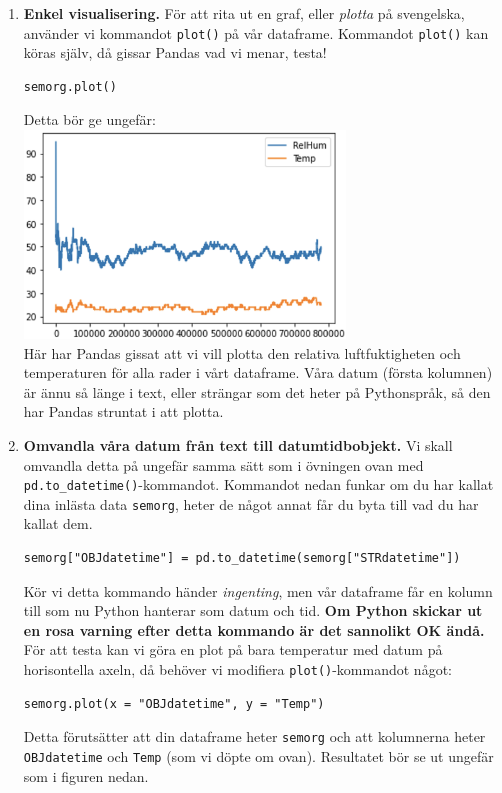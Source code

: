 \documentclass{article}
\begin{document}
\begin{enumerate}
\item \textbf{Enkel visualisering. } För att rita ut en graf, eller \emph{plotta} på svengelska, använder vi kommandot \verb+plot()+ på vår dataframe. Kommandot \verb+plot()+ kan köras själv, då gissar Pandas vad vi menar, testa!
\begin{verbatim}
semorg.plot()
\end{verbatim}
Detta bör ge ungefär:\\
\includegraphics[width=0.67\textwidth]{figures/anaconda10.png}\\
Här har Pandas gissat att vi vill plotta den relativa luftfuktigheten och temperaturen för alla rader i vårt dataframe. Våra datum (första kolumnen) är ännu så länge i text, eller strängar som det heter på Pythonspråk, så den har Pandas struntat i att plotta.
\item \textbf{Omvandla våra datum från text till datumtidbobjekt.} Vi skall omvandla detta på ungefär samma sätt som i övningen ovan med \\ \verb+pd.to_datetime()+-kommandot. Kommandot nedan funkar om du har kallat dina inlästa data \verb+semorg+, heter de något annat får du byta till vad du har kallat dem.
\begin{verbatim}
semorg["OBJdatetime"] = pd.to_datetime(semorg["STRdatetime"])
\end{verbatim}
Kör vi detta kommando händer \emph{ingenting}, men vår dataframe får en kolumn till som nu Python hanterar som datum och tid. \textbf{Om Python skickar ut en rosa varning efter detta kommando är det sannolikt OK ändå.} För att testa kan vi göra en plot på bara temperatur med datum på horisontella axeln, då behöver vi modifiera \verb+plot()+-kommandot något:
\begin{verbatim}
semorg.plot(x = "OBJdatetime", y = "Temp")
\end{verbatim}
Detta förutsätter att din dataframe heter \verb+semorg+ och att kolumnerna heter \verb+OBJdatetime+ och \verb+Temp+ (som vi döpte om ovan). Resultatet bör se ut ungefär som i figuren nedan.\\

\end{enumerate}
\end{document}
